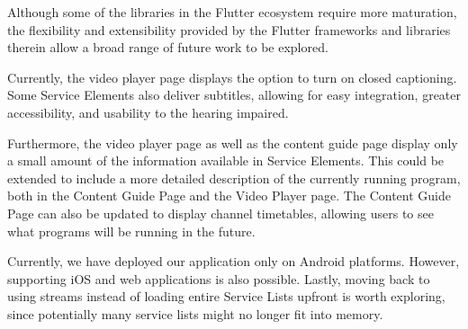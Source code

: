 \documentclass[conference]{IEEEtran}
\begin{document}
Although some of the libraries in the Flutter ecosystem require more maturation, the flexibility and extensibility provided by the Flutter frameworks and libraries therein allow a broad range of future work to be explored. \\\par
Currently, the video player page displays the option to turn on closed captioning. Some Service Elements also deliver subtitles, allowing for easy integration,  greater accessibility, and usability to the hearing impaired. \\\par
Furthermore, the video player page as well as the content guide page display only a small amount of the information available in Service Elements. This could be extended to include a more detailed description of the currently running program, both in the Content Guide Page and the Video Player page.
The Content Guide Page can also be updated to display channel timetables, allowing users to see what programs will be running in the future.
\\\par
 Currently, we have deployed our application only on Android platforms. However, supporting iOS and web applications is also possible.
Lastly, moving back to using streams instead of loading entire Service Lists upfront is worth exploring, since potentially many service lists might no longer fit into memory.
\end{document}

